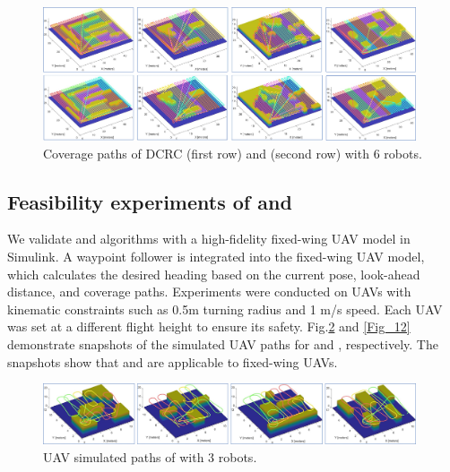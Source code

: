 \documentclass[journal,article,submit,pdftex,moreauthors]{Definitions/mdpi}
\begin{document}
\begin{figure}[htbp] %
	\centering  %
    \vspace{0 cm} %
    \includegraphics[width=0.98\textwidth]{9b.jpg}
    \caption{ Coverage paths of DCRC (first row) and  (second row) with 6 robots.}
   \label{Fig_9b}
\end{figure}


\subsection{Feasibility experiments of  and  }

We validate  and  algorithms with a high-fidelity fixed-wing UAV model \cite{UAVsimulated} in Simulink. A waypoint follower is integrated into the fixed-wing UAV model, which calculates the desired heading based on the current pose, look-ahead distance, and coverage paths. Experiments were conducted on UAVs with kinematic constraints such as 0.5m turning radius and 1 m/s speed. Each UAV was set at a different flight height to ensure its safety. Fig.\ref{Fig_11b} and \ref{Fig_12} demonstrate snapshots of the simulated UAV paths for  and  , respectively. The snapshots show that  and  are applicable to fixed-wing UAVs.

\begin{figure}[htbp] %
	\centering  %
    \vspace{0 cm} %
    \includegraphics[width=0.98\textwidth]{11b.jpg}
    \caption{ UAV simulated paths of  with 3 robots.}
   \label{Fig_11b}
\end{figure}
\end{document}
